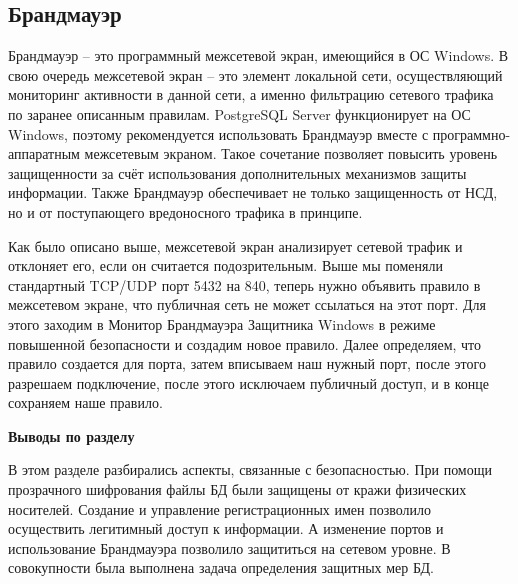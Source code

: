 \subsection{Брандмауэр}

Брандмауэр – это программный межсетевой экран, имеющийся в ОС Windows. В свою очередь межсетевой экран – это элемент локальной сети, осуществляющий мониторинг активности в данной сети, а именно фильтрацию сетевого трафика по заранее описанным правилам. PostgreSQL Server функционирует на ОС Windows, поэтому рекомендуется использовать Брандмауэр вместе с программно-аппаратным межсетевым экраном. Такое сочетание позволяет повысить уровень защищенности за счёт использования дополнительных механизмов защиты информации. Также Брандмауэр обеспечивает не только защищенность от НСД, но и от поступающего вредоносного трафика в принципе.

Как было описано выше, межсетевой экран анализирует сетевой трафик и отклоняет его, если он считается подозрительным. Выше мы поменяли стандартный TCP/UDP порт 5432 на 840, теперь нужно объявить правило в межсетевом экране, что публичная сеть не может ссылаться на этот порт. Для этого заходим в Монитор Брандмауэра Защитника Windows в режиме повышенной безопасности и создадим новое правило. Далее определяем, что правило создается для порта, затем вписываем наш нужный порт, после этого разрешаем подключение, после этого исключаем публичный доступ, и в конце сохраняем наше правило.




\textbf{Выводы по разделу}

В этом разделе разбирались аспекты, связанные с безопасностью. При помощи прозрачного шифрования файлы БД были защищены от кражи физических носителей. Создание и управление регистрационных имен позволило осуществить легитимный доступ к информации. А изменение портов и использование Брандмауэра позволило защититься на сетевом уровне. В совокупности была выполнена задача определения защитных мер БД.